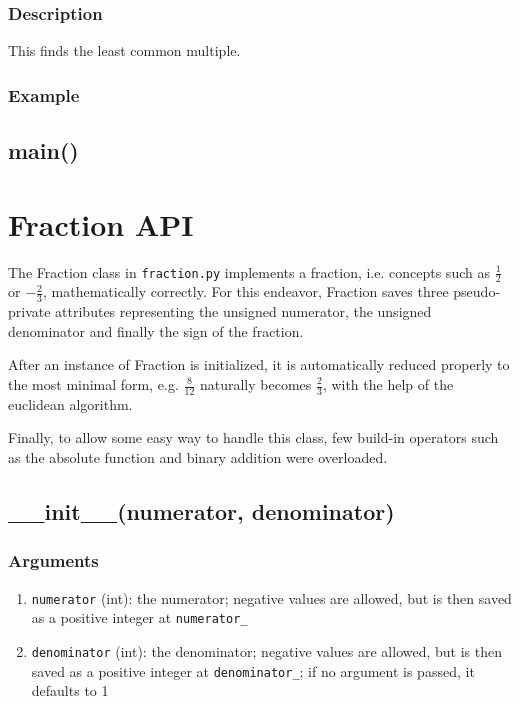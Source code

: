 \documentclass[refman]{scrartcl}
\begin{document}
\subsubsection*{Description}

This finds the least common multiple.

\subsubsection*{Example}

\subsection{main()}

\section{Fraction API}

The Fraction class in \texttt{fraction.py} implements a fraction, i.e. concepts such as \(\frac{1}{2}\) or \(-\frac{2}{3}\), mathematically correctly. For this endeavor, Fraction saves three pseudo-private attributes representing the unsigned numerator, the unsigned denominator and finally the sign of the fraction.

After an instance of Fraction is initialized, it is automatically reduced properly to the most minimal form, e.g. \(\frac{8}{12}\) naturally becomes \(\frac{2}{3}\), with the help of the euclidean algorithm.

Finally, to allow some easy way to handle this class, few build-in operators such as the absolute function and binary addition were overloaded.

\subsection{\_\_init\_\_(numerator, denominator)}

\subsubsection*{Arguments}

\begin{enumerate}
  \item \texttt{numerator} (int): the numerator; negative values are allowed, but is then saved as a positive integer at \texttt{numerator\_}
  \item \texttt{denominator} (int): the denominator; negative values are allowed, but is then saved as a positive integer at \texttt{denominator\_}; if no argument is passed, it defaults to 1
\end{enumerate}
\end{document}
